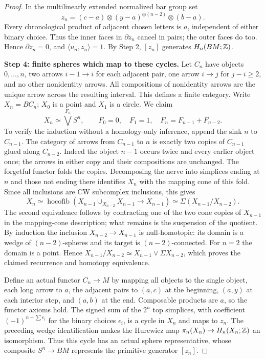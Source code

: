 \begin{proof}
In the multilinearly extended normalized bar group set
\[
 z_n=(c-a)\otimes(y-a)^{\otimes(n-2)}\otimes(b-a).
\]
Every chronological product of adjacent chosen letters is $a$,
independent of either binary choice. Thus the inner faces in
$\partial z_n$ cancel in pairs; the outer faces do too. Hence
$\partial z_n=0$, and $\langle u_n,z_n\rangle=1$.
By Step 2, $[z_n]$ generates $H_n(BM;\mathbb Z)$.

\textbf{Step 4: finite spheres which map to these cycles.}
Let $C_n$ have objects $0,\ldots,n$, two arrows $i-1\to i$ for
each adjacent pair, one arrow $i\to j$ for $j-i\ge2$, and no
other nonidentity arrows. All compositions of nonidentity arrows
are the unique arrow across the resulting interval. This defines
a finite category. Write $X_n=BC_n$; $X_0$ is a point and
$X_1$ is a circle. We claim
\[
 X_n\simeq\bigvee^{F_n}S^n,\qquad
 F_0=0,\quad F_1=1,\quad F_n=F_{n-1}+F_{n-2}.
\]
To verify the induction without a homology-only inference, append the
sink $n$ to $C_{n-1}$. The category of arrows from $C_{n-1}$ to $n$
is exactly two copies of $C_{n-1}$ glued along $C_{n-2}$.
Indeed the object $n-1$ occurs twice and every earlier object once;
the arrows in either copy and their compositions are unchanged.
The forgetful functor folds the copies. Decomposing the nerve into
simplices ending at $n$ and those not ending there identifies $X_n$
with the mapping cone of this fold. Since all inclusions are CW
subcomplex inclusions, this gives
\[
 X_n\simeq\operatorname{hocofib}
 (X_{n-1}\cup_{X_{n-2}}X_{n-1}\longrightarrow X_{n-1})
 \simeq\Sigma(X_{n-1}/X_{n-2}).
\]
The second equivalence follows by contracting one of the two cone copies
of $X_{n-1}$ in the mapping-cone description; what remains is the
suspension of the quotient. By induction the inclusion
$X_{n-2}\to X_{n-1}$ is null-homotopic: its domain is a wedge of
$(n-2)$-spheres and its target is $(n-2)$-connected. For $n=2$
the domain is a point. Hence
$X_{n-1}/X_{n-2}\simeq X_{n-1}\vee\Sigma X_{n-2}$,
which proves the claimed recurrence and homotopy equivalence.

Define an actual functor $C_n\to M$ by mapping all objects to the
single object, each long arrow to $a$, the adjacent pairs to
$(a,c)$ at the beginning, $(a,y)$ at each interior step, and
$(a,b)$ at the end. Composable products are $a$, so the functor
axioms hold. The signed sum of the $2^n$ top simplices, with
coefficient $(-1)^{n-\sum\epsilon_i}$ for the binary choices
$\epsilon_i$, is a cycle in $X_n$ and maps to $z_n$.
The preceding wedge identification makes the Hurewicz map
$\pi_n(X_n)\to H_n(X_n;\mathbb Z)$ an isomorphism. Thus this cycle
has an actual sphere representative, whose composite $S^n\to BM$
represents the primitive generator $[z_n]$.


\end{proof}
